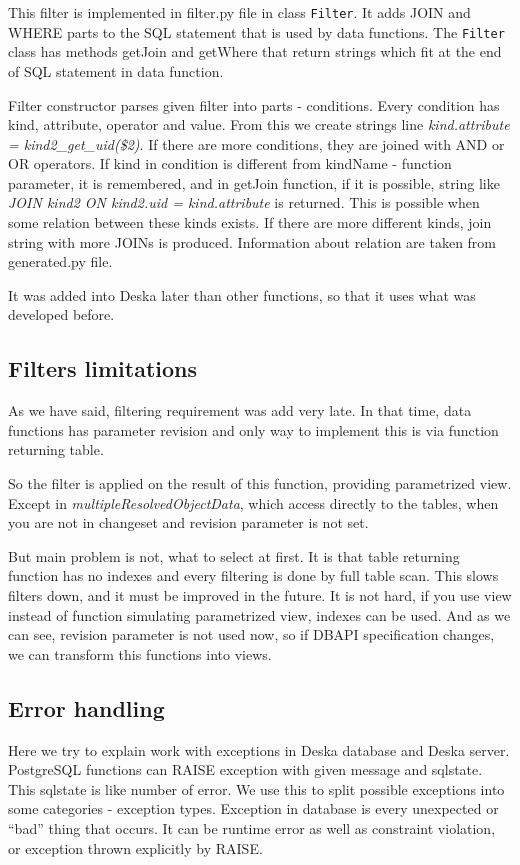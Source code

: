 \documentclass[deska]{subfiles}
\begin{document}
This filter is implemented in filter.py file in class {\tt Filter}.
It adds JOIN and WHERE parts to the SQL statement that is used by data functions. The {\tt Filter} class has
methods getJoin and getWhere that return strings which fit at the end of SQL statement in data function.

Filter constructor parses given filter into parts - conditions.
Every condition has kind, attribute, operator and value. From this we create strings line
{\em kind.attribute = kind2\_get\_uid(\$2)}. If there are more conditions, they are joined with AND or OR
operators.
If kind in condition is different from kindName - function parameter, it is remembered,
and in getJoin function, if it is possible, string like {\em JOIN kind2 ON kind2.uid = kind.attribute}
is returned. This is possible when some relation between these kinds exists.
If there are more different kinds, join string with more JOINs is produced.
Information about relation are taken from generated.py file.

It was added into Deska later than other functions, so that it uses what was developed before.

\subsection{Filters limitations}
\label{sec:filter-speed}
As we have said, filtering requirement was add very late. In that time, data functions has parameter revision
and only way to implement this is via function returning table.

So the filter is applied on the result of this function, providing parametrized view.
Except in {\em multipleResolvedObjectData}, which access directly to the tables, when
you are not in changeset and revision parameter is not set.

But main problem is not, what to select at first. It is that table returning function has
no indexes and every filtering is done by full table scan.
This slows filters down, and it must be improved in the future. It is not hard,
if you use view instead of function simulating parametrized view, indexes can be used.
And as we can see, revision parameter is not used now, so if DBAPI specification changes,
we can transform this functions into views. 

\subsection{Error handling}
Here we try to explain work with exceptions in Deska database and Deska server. PostgreSQL functions can RAISE exception with given message and sqlstate.
This sqlstate is like number of error. We use this to split possible exceptions into some categories - exception types. Exception in database is
every unexpected or “bad” thing that occurs. It can be runtime error as well as constraint violation, or exception thrown explicitly by RAISE.
\end{document}
